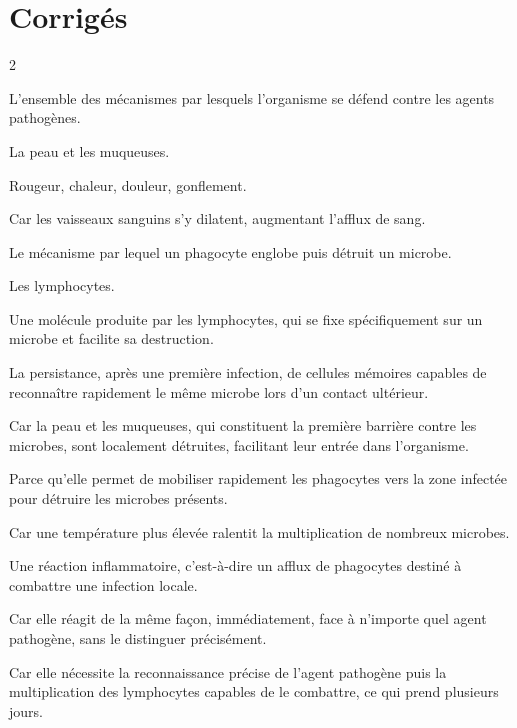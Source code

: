 \section{Corrigés}
\begin{multicols}{2}

L'ensemble des mécanismes par lesquels l'organisme se défend contre les agents
pathogènes.

La peau et les muqueuses.

Rougeur, chaleur, douleur, gonflement.

Car les vaisseaux sanguins s'y dilatent, augmentant l'afflux de sang.

Le mécanisme par lequel un phagocyte englobe puis détruit un microbe.

Les lymphocytes.

Une molécule produite par les lymphocytes, qui se fixe spécifiquement sur un microbe
et facilite sa destruction.

La persistance, après une première infection, de cellules mémoires capables de
reconnaître rapidement le même microbe lors d'un contact ultérieur.

Car la peau et les muqueuses, qui constituent la première barrière contre les
microbes, sont localement détruites, facilitant leur entrée dans l'organisme.

Parce qu'elle permet de mobiliser rapidement les phagocytes vers la zone infectée pour
détruire les microbes présents.

Car une température plus élevée ralentit la multiplication de nombreux microbes.

Une réaction inflammatoire, c'est-à-dire un afflux de phagocytes destiné à combattre
une infection locale.

Car elle réagit de la même façon, immédiatement, face à n'importe quel agent
pathogène, sans le distinguer précisément.

Car elle nécessite la reconnaissance précise de l'agent pathogène puis la
multiplication des lymphocytes capables de le combattre, ce qui prend plusieurs
jours.


\end{multicols}
